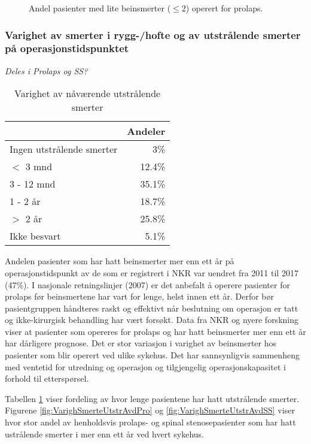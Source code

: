 \documentclass [norsk,a4paper,twoside]{article}\usepackage[]{graphicx}\usepackage[]{color}
\begin{document}
\begin{figure}[ht]
\caption{\label{fig:BeinsmLavPre}  Andel pasienter med lite beinsmerter ($\leq 2$) operert for prolaps.}
\end{figure}



\subsubsection{Varighet av smerter i rygg-/hofte og av utstrålende smerter på operasjonstidspunktet}

\textit{Deles i Prolaps og SS?}
\begin{table}[ht]
\centering
\begin{tabular}{lr}
  \hline
 & Andeler \\ 
  \hline
Ingen utstrålende smerter & 3\% \\ 
  $<$ 3 mnd & 12.4\% \\ 
  3 - 12 mnd & 35.1\% \\ 
  1 - 2 år & 18.7\% \\ 
  $>$ 2 år & 25.8\% \\ 
  Ikke besvart & 5.1\% \\ 
   \hline
\end{tabular}
\caption{Varighet av nåværende utstrålende smerter} 
\label{tab:Utstr}
\end{table}

      
      Andelen pasienter som har hatt beinsmerter mer enn ett år på
operasjonstidspunkt av de som er registrert i NKR var uendret fra 2011 til 2017 (47\%). 
I nasjonale retningslinjer (2007) er det anbefalt å operere pasienter for prolaps før
beinsmertene har vart for lenge, helst innen ett år. Derfor bør
pasientgruppen håndteres raskt og effektivt når beslutning om operasjon er tatt og
ikke-kirurgisk behandling har vært forsøkt. Data fra NKR og nyere forskning viser at
pasienter som opereres for prolaps og har hatt beinsmerter mer enn ett år har
dårligere prognose. 
Det er stor variasjon i varighet av beinsmerter hos pasienter som blir
operert ved ulike sykehus. Det har sannsynligvis sammenheng med ventetid for
utredning og operasjon og tilgjengelig operasjonskapasitet i forhold til etterspørsel.




Tabellen  \ref{tab:Utstr} viser fordeling av hvor lenge pasientene har hatt utstrålende smerter. 
Figurene \ref{fig:VarighSmerteUtstrAvdPro} og \ref{fig:VarighSmerteUtstrAvdSS} viser hvor stor andel av henholdsvis prolaps- og spinal stenosepasienter som har hatt ustrålende smerter i mer enn ett år ved hvert sykehus. 
\end{document}

